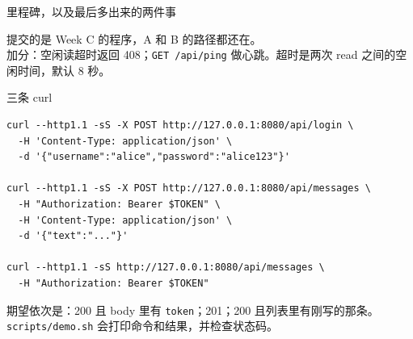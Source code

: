 \documentclass[aspectratio=169,11pt,professionalfonts]{ctexbeamer}
\begin{document}
\begin{frame}{里程碑，以及最后多出来的两件事}
\begin{center}
\setlength{\fboxsep}{5pt}
\hspace{0.25em}{\color{accent}$\rightarrow$}\hspace{0.25em}
\hspace{0.25em}{\color{accent}$\rightarrow$}\hspace{0.25em}
\end{center}
\vspace{0.45em}
提交的是 Week C 的程序，A 和 B 的路径都还在。\\
加分：空闲读超时返回 408；\texttt{GET /api/ping} 做心跳。超时是两次 read 之间的空闲时间，默认 8 秒。
\end{frame}

\begin{frame}[fragile]{三条 curl}
\begin{lstlisting}[style=plain]
curl --http1.1 -sS -X POST http://127.0.0.1:8080/api/login \
  -H 'Content-Type: application/json' \
  -d '{"username":"alice","password":"alice123"}'

curl --http1.1 -sS -X POST http://127.0.0.1:8080/api/messages \
  -H "Authorization: Bearer $TOKEN" \
  -H 'Content-Type: application/json' \
  -d '{"text":"..."}'

curl --http1.1 -sS http://127.0.0.1:8080/api/messages \
  -H "Authorization: Bearer $TOKEN"
\end{lstlisting}
\vspace{-0.15em}
{\small 期望依次是：200 且 body 里有 \texttt{token}；201；200 且列表里有刚写的那条。\\
\texttt{scripts/demo.sh} 会打印命令和结果，并检查状态码。}
\end{frame}
\end{document}
